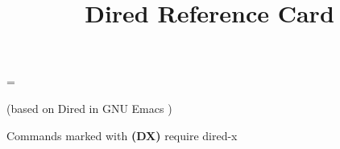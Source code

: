 \def\key#1#2{\leavevmode\hbox to \hsize{\vtop
  {\hsize=.75\hsize\rightskip=1em
  \hskip\keyindent\relax#1}\kbd{#2}\hfil}}

\newbox\metaxbox
\setbox\metaxbox\hbox{}
\newdimen\metaxwidth
\metaxwidth=\wd\metaxbox

\def\metax#1#2{\leavevmode\hbox to \hsize{\hbox to .75\hsize
  {\hskip\keyindent\relax#1\hfil}%
  \hskip -\metaxwidth minus 1fil
  \kbd{#2}\hfil}}

\def\threecol#1#2#3{\hskip\keyindent\relax#1\hfil&\kbd{#2}\hfil\quad
  &\kbd{#3}\hfil\quad\cr}

\def\dx{{\bf (DX)}}

\nopagenumbers



\title{Dired Reference Card}

\centerline{(based on Dired in GNU Emacs \versionemacs)}
\centerline{Commands marked with \dx{} require dired-x}




